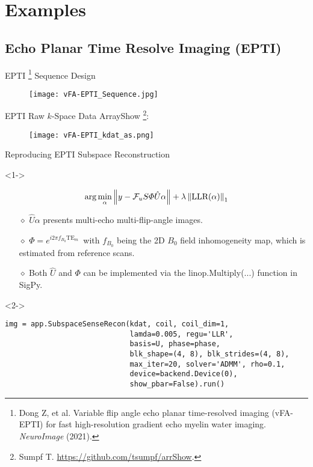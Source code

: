\section{Examples}

\subsection{Echo Planar Time Resolve Imaging (EPTI)}
\begin{frame}{EPTI \footnote{Dong Z, et al. Variable flip angle echo planar time-resolved imaging (vFA-EPTI) for fast high-resolution gradient echo myelin water imaging. \textit{NeuroImage} (2021).} Sequence Design}
	\begin{figure}
		\texttt{[image: vFA-EPTI\_Sequence.jpg]}
	\end{figure}
\end{frame}

\begin{frame}{EPTI Raw $k$-Space Data}
	ArrayShow \footnote{Sumpf T. \url{https://github.com/tsumpf/arrShow}.}:
	\begin{figure}
		\texttt{[image: vFA-EPTI\_kdat\_as.png]}
	\end{figure}
\end{frame}

\begin{frame}[fragile]{Reproducing EPTI Subspace Reconstruction}
\begin{block}<1->{}
	{\large
	\begin{equation}
		\mathrm{arg}\min_\alpha \left\| y - \mathcal{F}_u S \Phi \hat{U} \alpha \right\| + \lambda \left\|\text{LLR}(\alpha)\right\|_1
	\end{equation}
	\begin{itemize}
		\item [$\diamond$] $\hat{U} \alpha$ presents multi-echo multi-flip-angle images.
		\item [$\diamond$] $\Phi = e^{i2\pi f_{B_0} \text{TE}_m}$~with $f_{B_0}$ being the 2D $B_0$ field inhomogeneity map, which is estimated from reference scans.
		\item [$\diamond$] Both $\hat{U}$ and $\Phi$ can be implemented 
		via the linop.Multiply(...) function in SigPy.
	\end{itemize}}
\end{block}

\begin{block}<2->{}
\begin{lstlisting}
img = app.SubspaceSenseRecon(kdat, coil, coil_dim=1,
                             lamda=0.005, regu='LLR',
                             basis=U, phase=phase,
                             blk_shape=(4, 8), blk_strides=(4, 8),
                             max_iter=20, solver='ADMM', rho=0.1,
                             device=backend.Device(0),
                             show_pbar=False).run()
\end{lstlisting}
\end{block}

\end{frame}

